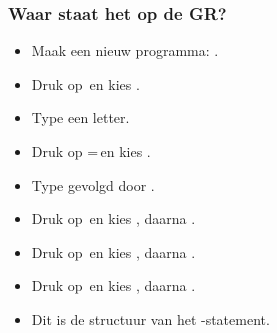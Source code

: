 \begin{frame}
\frametitle{Waar staat het op de GR?}


\begin{itemize}
  \item<1-> Maak een nieuw programma: .
  \item<2-> Druk op \tiPRGM\,en kies .
  \item<3-> Type een letter.
  \item<4-> Druk op \tiTEST=\tiSecond\tiMATH\,en kies \tifonttxt{=}.
  \item<5-> Type  gevolgd door \tiENTER.
  \item<6-> Druk op \tiPRGM\,en kies , daarna \tiENTER.
  \item<7-> Druk op \tiPRGM\,en kies , daarna \tiENTER.
  \item<8-> Druk op \tiPRGM\,en kies , daarna \tiENTER.
  \item<9-> Dit is de structuur van het -statement.
\end{itemize}



\end{frame}
